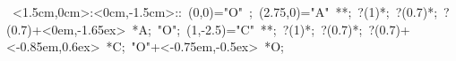 
\hbox{
\xy    <1.5cm,0cm>:<0cm,-1.5cm>::
       (0,0)="O" ; (2.75,0)="A" **\dir{-};  ?(1)*\dir{>}; 
       ?(0.7)*{\bullet}; ?(0.7)+<0em,-1.65ex> *{A};
       "O"; (1,-2.5)="C" **\dir{-};  ?(1)*\dir{>};
       ?(0.7)*{\bullet}; ?(0.7)+<-0.85em,0.6ex> *{C};
       "O"+<-0.75em,-0.5ex> *{O};
       \endxy}
